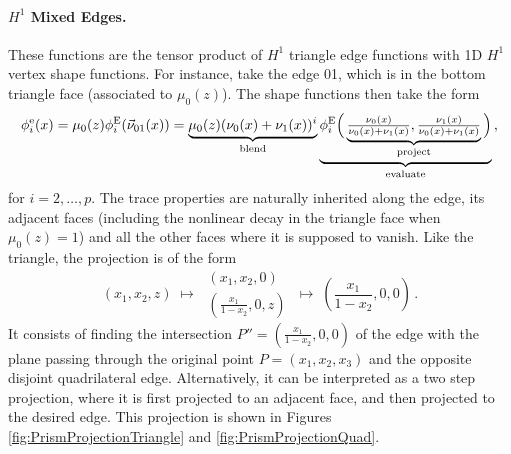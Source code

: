\paragraph{\texorpdfstring{$H^1$}{H1} Mixed Edges.} 
These functions are the tensor product of $H^1$ triangle edge functions with 1D $H^1$ vertex shape functions. 
For instance, take the edge 01, which is in the bottom triangle face (associated to $\mu_0(z)$). 
The shape functions then take the form
\begin{equation*}
    \phi_i^\mathrm{e}(x)=\mu_0(z)\phi_i^{\mathrm{E}}(\vec{\nu}_{01}(x))
    	=\underbrace{\mu_0(z)(\nu_0(x)+\nu_1(x))^i}_{\text{blend}}
    		\underbrace{\phi_i^{\mathrm{E}}\Big(\underbrace{\textstyle{\frac{\nu_0(x)}{\nu_0(x)+\nu_1(x)}},
    			\textstyle{\frac{\nu_1(x)}{\nu_0(x)+\nu_1(x)}}}_{\text{project}}\Big)}_{\text{evaluate}}\,,
\end{equation*}
for $i=2,\ldots,p$.
The trace properties are naturally inherited along the edge, its adjacent faces (including the nonlinear decay in the triangle face when $\mu_0(z)=1$) and all the other faces where it is supposed to vanish.
Like the triangle, the projection is of the form
\begin{equation*}
	(x_1,x_2,z)\;\longmapsto\;\begin{matrix}(x_1,x_2,0)\\(\frac{x_1}{1-x_2},0,z)\end{matrix}
		\;\longmapsto\;(\textstyle{\frac{x_1}{1-x_2}},0,0)\,.
\end{equation*}
It consists of finding the intersection $P''=(\frac{x_1}{1-x_2},0,0)$ of the edge with the plane passing through the original point $P=(x_1,x_2,x_3)$ and the opposite disjoint quadrilateral edge. 
Alternatively, it can be interpreted as a two step projection, where it is first projected to an adjacent face, and then projected to the desired edge. 
This projection is shown in Figures \ref{fig:PrismProjectionTriangle} and \ref{fig:PrismProjectionQuad}.

